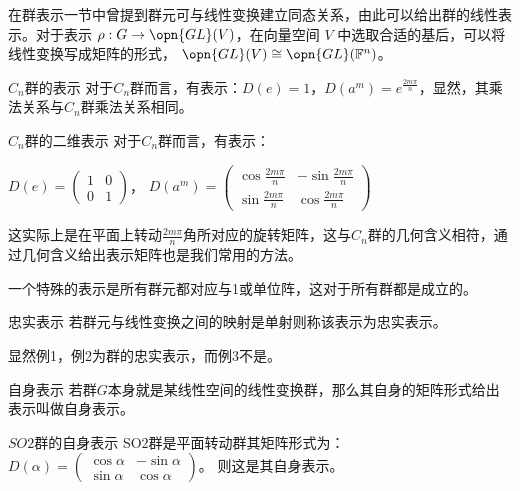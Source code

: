

在群表示一节中曾提到群元可与线性变换建立同态关系，由此可以给出群的线性表示。对于表示 $\rho: G \to \opn{GL}(V)$，在向量空间 $V$ 中选取合适的基后，可以将线性变换写成矩阵的形式， $\opn{GL}(V) \cong \opn{GL}(\mathbb{F}^n)$。

\begin{example}{$C_n$群的表示}
对于$C_n$群而言，有表示：$D(e)=1$，$D(a^m)=e^{\frac{2m\pi}{n}}$，显然，其乘法关系与$C_n$群乘法关系相同。
\label{gprep_ex1}
\end{example}

\begin{example}{$C_n$群的二维表示}
对于$C_n$群而言，有表示：

$D(e)=\begin{pmatrix}
 1 & 0\\
 0 &1
\end{pmatrix}$，
$D(a^m)=\begin{pmatrix}
 \cos{\frac{2m\pi}{n}} & -\sin{\frac{2m\pi}{n}}\\
 \sin{\frac{2m\pi}{n}} &\cos{\frac{2m\pi}{n}}
\end{pmatrix}$

这实际上是在平面上转动$\frac{2m\pi}{n}$角所对应的旋转矩阵，这与$C_n$群的几何含义相符，通过几何含义给出表示矩阵也是我们常用的方法。
\end{example}

\begin{example}{}
一个特殊的表示是所有群元都对应与1或单位阵，这对于所有群都是成立的。
\label{gprep_ex3}
\end{example}

\begin{definition}{忠实表示}
若群元与线性变换之间的映射是单射则称该表示为忠实表示。
\end{definition}

显然例1，例2为群的忠实表示，而例3不是。

\begin{definition}{自身表示}
若群$G$本身就是某线性空间的线性变换群，那么其自身的矩阵形式给出表示叫做自身表示。
\end{definition}
\begin{example}{$SO2$群的自身表示}
SO2群是平面转动群其矩阵形式为：$D(\alpha)=\begin{pmatrix}
 \cos{\alpha} & -\sin{\alpha}\\
 \sin{\alpha} & \cos{\alpha}
\end{pmatrix}$。
则这是其自身表示。
\end{example}

